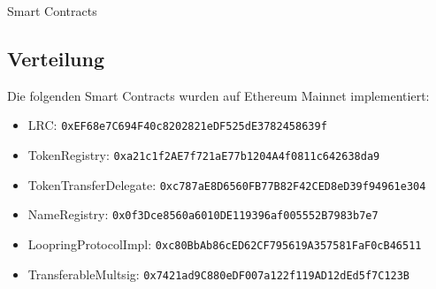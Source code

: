 \documentclass[UTF8,nofonts]{article}
\makeatletter
\newenvironment{figurehere}
 {\def\@captype{figure}}
 {}
\makeatother
\begin{document}
\begin{appendices}
\begin{center}
\begin{figurehere}
\caption{Smart Contracts}
\label{fig:smartcontracts}
\end{figurehere}
\end{center}

\subsection{Verteilung}

Die folgenden Smart Contracts wurden auf Ethereum Mainnet implementiert:
\begin{itemize}
\item LRC: \verb|0xEF68e7C694F40c8202821eDF525dE3782458639f|
\item TokenRegistry: \verb|0xa21c1f2AE7f721aE77b1204A4f0811c642638da9|
\item TokenTransferDelegate: \verb|0xc787aE8D6560FB77B82F42CED8eD39f94961e304|
\item NameRegistry: \verb|0x0f3Dce8560a6010DE119396af005552B7983b7e7|
\item LoopringProtocolImpl: \verb|0xc80BbAb86cED62CF795619A357581FaF0cB46511|
\item TransferableMultsig: \verb|0x7421ad9C880eDF007a122f119AD12dEd5f7C123B|
\end{itemize}

\end{appendices}
\end{document}
